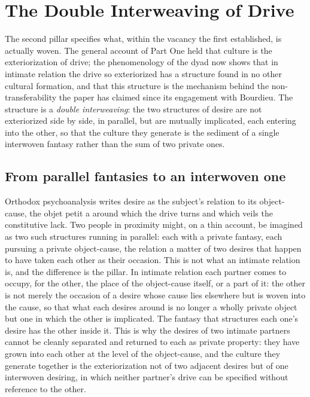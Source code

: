 \section{The Double Interweaving of Drive}
\label{p24:sec:interweaving}

\noindent
The second pillar specifies what, within the vacancy the first established, is actually woven. The general account of Part One held that culture is the exteriorization of drive; the phenomenology of the dyad now shows that in intimate relation the drive so exteriorized has a structure found in no other cultural formation, and that this structure is the mechanism behind the non-transferability the paper has claimed since its engagement with Bourdieu. The structure is a \emph{double interweaving}: the two structures of desire are not exteriorized side by side, in parallel, but are mutually implicated, each entering into the other, so that the culture they generate is the sediment of a single interwoven fantasy rather than the sum of two private ones.

\subsection*{From parallel fantasies to an interwoven one}

Orthodox psychoanalysis writes desire as the subject's relation to its object-cause, the objet petit a around which the drive turns and which veils the constitutive lack. Two people in proximity might, on a thin account, be imagined as two such structures running in parallel: each with a private fantasy, each pursuing a private object-cause, the relation a matter of two desires that happen to have taken each other as their occasion. This is not what an intimate relation is, and the difference is the pillar. In intimate relation each partner comes to occupy, for the other, the place of the object-cause itself, or a part of it: the other is not merely the occasion of a desire whose cause lies elsewhere but is woven into the cause, so that what each desires around is no longer a wholly private object but one in which the other is implicated. The fantasy that structures each one's desire has the other inside it. This is why the desires of two intimate partners cannot be cleanly separated and returned to each as private property: they have grown into each other at the level of the object-cause, and the culture they generate together is the exteriorization not of two adjacent desires but of one interwoven desiring, in which neither partner's drive can be specified without reference to the other.

